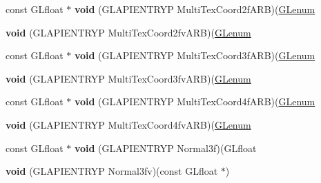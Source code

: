 \begin{DoxyCompactItemize}
\item 
\mbox{\label{struct_g_lvertexformat_a62077024b4b14bf9b7b34e57fd2567ea}} 
const G\+Lfloat $\ast$ {\bfseries void} (G\+L\+A\+P\+I\+E\+N\+T\+R\+YP Multi\+Tex\+Coord2f\+A\+RB)(\hyperlink{interfacevoid}{G\+Lenum}
\item 
\mbox{\label{struct_g_lvertexformat_a795f46d0e781de750e994105c9ecee96}} 
{\bfseries void} (G\+L\+A\+P\+I\+E\+N\+T\+R\+YP Multi\+Tex\+Coord2fv\+A\+RB)(\hyperlink{interfacevoid}{G\+Lenum}
\item 
\mbox{\label{struct_g_lvertexformat_a6093b63e38fe40c42aed99d3b6e5eb93}} 
const G\+Lfloat $\ast$ {\bfseries void} (G\+L\+A\+P\+I\+E\+N\+T\+R\+YP Multi\+Tex\+Coord3f\+A\+RB)(\hyperlink{interfacevoid}{G\+Lenum}
\item 
\mbox{\label{struct_g_lvertexformat_a570b8a7ce36105b7d1024199322cc1a5}} 
{\bfseries void} (G\+L\+A\+P\+I\+E\+N\+T\+R\+YP Multi\+Tex\+Coord3fv\+A\+RB)(\hyperlink{interfacevoid}{G\+Lenum}
\item 
\mbox{\label{struct_g_lvertexformat_a26e58a56ad9d762f8807833bdf7f55c5}} 
const G\+Lfloat $\ast$ {\bfseries void} (G\+L\+A\+P\+I\+E\+N\+T\+R\+YP Multi\+Tex\+Coord4f\+A\+RB)(\hyperlink{interfacevoid}{G\+Lenum}
\item 
\mbox{\label{struct_g_lvertexformat_a005d5a633c1470fa7c986a1d4c2d5304}} 
{\bfseries void} (G\+L\+A\+P\+I\+E\+N\+T\+R\+YP Multi\+Tex\+Coord4fv\+A\+RB)(\hyperlink{interfacevoid}{G\+Lenum}
\item 
\mbox{\label{struct_g_lvertexformat_ad14fffa444776a0bafcd89fdd3dec3d8}} 
const G\+Lfloat $\ast$ {\bfseries void} (G\+L\+A\+P\+I\+E\+N\+T\+R\+YP Normal3f)(G\+Lfloat
\item 
\mbox{\label{struct_g_lvertexformat_a471d6553f055c73bed6d11eb3b89b04a}} 
{\bfseries void} (G\+L\+A\+P\+I\+E\+N\+T\+R\+YP Normal3fv)(const G\+Lfloat $\ast$)
\item 
\mbox{\label{struct_g_lvertexformat_af90c3da68bbb906e0900197be415a6cc}} 

\end{DoxyCompactItemize}
